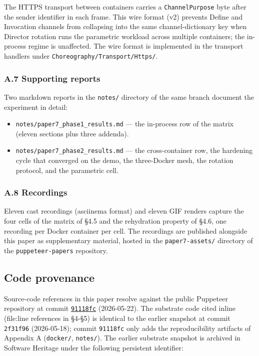 \documentclass[
]{article}
\providecommand{\tightlist}{%
  \setlength{\itemsep}{0pt}\setlength{\parskip}{0pt}}
\begin{document}
The HTTPS transport between containers carries a \texttt{ChannelPurpose}
byte after the sender identifier in each frame. This wire format (v2)
prevents Define and Invocation channels from collapsing into the same
channel-dictionary key when Director rotation runs the parametric
workload across multiple containers; the in-process regime is
unaffected. The wire format is implemented in the transport handlers
under \texttt{Choreography/Transport/Https/}.

\subsubsection{A.7 Supporting reports}\label{a.7-supporting-reports}

Two markdown reports in the \texttt{notes/} directory of the same branch
document the experiment in detail:

\begin{itemize}
\tightlist
\item
  \texttt{notes/paper7\_phase1\_results.md} --- the in-process row of
  the matrix (eleven sections plus three addenda).
\item
  \texttt{notes/paper7\_phase2\_results.md} --- the cross-container row,
  the hardening cycle that converged on the demo, the three-Docker mesh,
  the rotation protocol, and the parametric cell.
\end{itemize}

\subsubsection{A.8 Recordings}\label{a.8-recordings}

Eleven cast recordings (asciinema format) and eleven GIF renders capture
the four cells of the matrix of §4.5 and the rehydration property of
§4.6, one recording per Docker container per cell. The recordings are
published alongside this paper as supplementary material, hosted in the
\texttt{paper7-assets/} directory of the \texttt{puppeteer-papers}
repository.

\subsection{Code provenance}\label{code-provenance}

Source-code references in this paper resolve against the public
Puppeteer repository at commit
\href{https://github.com/alvaroNCubo/puppeteer/tree/91118fc1a3d865e0bb44e0490712c46ceacf5c63}{\texttt{91118fc}}
(2026-05-22). The substrate code cited inline (file:line references in
§4-§5) is identical to the earlier snapshot at commit \texttt{2f31f96}
(2026-05-18); commit \texttt{91118fc} only adds the reproducibility
artifacts of Appendix A (\texttt{docker/}, \texttt{notes/}). The earlier
substrate snapshot is archived in Software Heritage under the following
persistent identifier:
\end{document}
